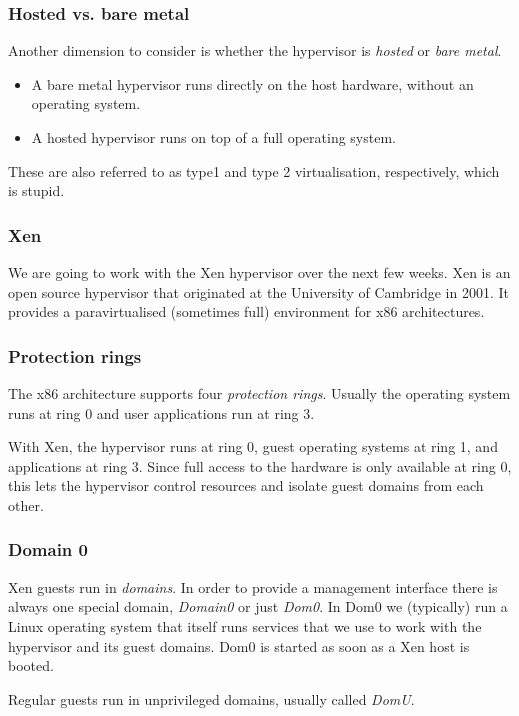 \documentclass[10pt]{beamer}
\begin{document}
\begin{frame}
  \frametitle{Hosted vs. bare metal}
  
  Another dimension to consider is whether the hypervisor is \emph{hosted} or \emph{bare metal}.
  
  \begin{itemize}
    \item A bare metal hypervisor runs directly on the host hardware, without an operating system.
    \item A hosted hypervisor runs on top of a full operating system.
    \end{itemize}
    
    These are also referred to as type1 and type 2 virtualisation, respectively, which is stupid.
   
\end{frame}
   
\begin{frame}
  \frametitle{Xen}
   
   We are going to work with the Xen hypervisor over the next few weeks. Xen is an open source hypervisor that originated at the University of Cambridge in 2001. 
   It provides a paravirtualised (sometimes full) environment for x86 architectures.
     
\end{frame}

\begin{frame}
  \frametitle{Protection rings}
   
   The x86 architecture supports four \emph{protection rings}. Usually the operating system runs at ring 0 and user applications run at ring 3. 
   
    \vspace{5mm}
   
   With Xen, the hypervisor 
   runs at ring 0, guest operating systems at ring 1, and applications at ring 3. Since full access to the hardware is only available at ring 0, this lets the hypervisor 
   control resources and isolate guest domains from each other.
           
\end{frame}

\begin{frame}
  \frametitle{Domain 0}
   
  Xen guests run in \emph{domains}. In order to provide a management interface there is always one special domain, \emph{Domain0} or just 
  \emph{Dom0}. In Dom0 we (typically) run a Linux operating system that itself runs services that we use to work with the hypervisor and its guest domains. Dom0 is 
  started as soon as a Xen host is booted.
  
  \vspace{5mm}
  
  Regular guests run in unprivileged domains, usually called \emph{DomU}.
           
\end{frame}
\end{document}
